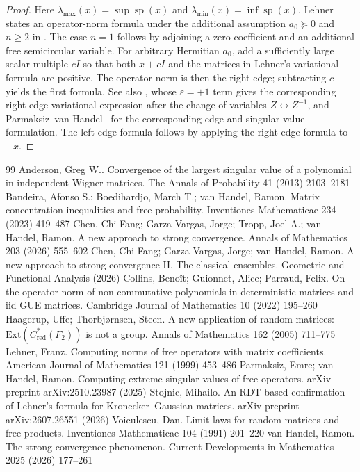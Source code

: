 \documentclass[10pt,a4paper]{amsart}
\begin{document}
\begin{proof}
	Here \(\lambda_{\max}(x)=\sup\operatorname{sp}(x)\) and
	\(\lambda_{\min}(x)=\inf\operatorname{sp}(x)\).
	Lehner states an operator-norm formula under the additional assumption
	\(a_0\succeq0\) and \(n\ge2\) in \cite[Corollary~1.5]{Lehner}.  The case
	\(n=1\) follows by adjoining a zero coefficient and an additional free
	semicircular variable.  For arbitrary Hermitian \(a_0\), add a sufficiently
	large scalar multiple \(cI\) so that both \(x+cI\) and the matrices in
	Lehner's variational formula are positive.  The operator norm is then the
	right edge; subtracting \(c\) yields the first formula.  See also
	\cite[Lemma~2.4]{BBvH2023}, whose \(\varepsilon=+1\) term gives the
	corresponding right-edge variational expression after the change of variables
	\(Z\leftrightarrow Z^{-1}\), and Parmaksiz--van
	Handel~\cite{ParmaksizVanHandel2025} for the corresponding edge and
	singular-value formulation.  The left-edge formula follows by applying the
	right-edge formula to \(-x\).
\end{proof}


\begin{thebibliography}{99}
 Anderson, Greg W.. Convergence of the largest singular value of a polynomial in independent {W}igner matrices. The Annals of Probability 41 (2013) 2103--2181
 Bandeira, Afonso S.; Boedihardjo, March T.; van Handel, Ramon. Matrix concentration inequalities and free probability. Inventiones Mathematicae 234 (2023) 419--487
 Chen, Chi-Fang; Garza-Vargas, Jorge; Tropp, Joel A.; van Handel, Ramon. A new approach to strong convergence. Annals of Mathematics 203 (2026) 555--602
 Chen, Chi-Fang; Garza-Vargas, Jorge; van Handel, Ramon. A new approach to strong convergence {II}. {The} classical ensembles. Geometric and Functional Analysis (2026)
 Collins, Beno{\^i}t; Guionnet, Alice; Parraud, Felix. On the operator norm of non-commutative polynomials in deterministic matrices and iid {GUE} matrices. Cambridge Journal of Mathematics 10 (2022) 195--260
 Haagerup, Uffe; Thorbj{\o}rnsen, Steen. A new application of random matrices: {$\mathrm{Ext}(C^*_{\mathrm{red}}(F_2))$} is not a group. Annals of Mathematics 162 (2005) 711--775
 Lehner, Franz. Computing norms of free operators with matrix coefficients. American Journal of Mathematics 121 (1999) 453--486
 Parmaksiz, Emre; van Handel, Ramon. Computing extreme singular values of free operators. arXiv preprint arXiv:2510.23987 (2025)
 Stojnic, Mihailo. An {RDT} based confirmation of {Lehner}'s formula for {Kronecker}--{Gaussian} matrices. arXiv preprint arXiv:2607.26551 (2026)
 Voiculescu, Dan. Limit laws for random matrices and free products. Inventiones Mathematicae 104 (1991) 201--220
 van Handel, Ramon. The strong convergence phenomenon. Current Developments in Mathematics 2025 (2026) 177--261
\end{thebibliography}
\end{document}
